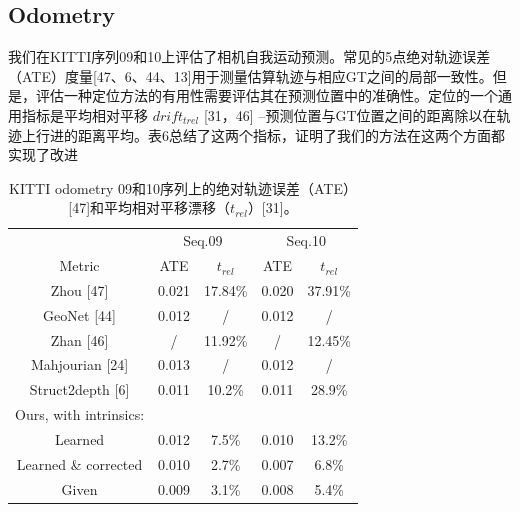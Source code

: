 \documentclass[10pt,journal,compsoc,UTF8]{IEEEtran}
\begin{document}
\subsection{Odometry}
我们在KITTI序列09和10上评估了相机自我运动预测。常见的5点绝对轨迹误差（ATE）度量[47、6、44、13]用于测量估算轨迹与相应GT之间的局部一致性。但是，评估一种定位方法的有用性需要评估其在预测位置中的准确性。定位的一个通用指标是平均相对平移 $drift_{trel}$ [31，46] –预测位置与GT位置之间的距离除以在轨迹上行进的距离平均。表6总结了这两个指标，证明了我们的方法在这两个方面都实现了改进

\begin{table}
  \centering
  \begin{tabular}{|c|c|c|c|c|}
  \hline
  &\multicolumn{2}{c|}{Seq.09}&\multicolumn{2}{c|}{Seq.10}\\
  \cline{2-5}
  Metric& ATE& $t_{rel}$ &ATE& $t_{rel}$\\
  \hline
  Zhou [47]         &  0.021& 17.84\%& 0.020& 37.91\%\\
  GeoNet [44]       &  0.012&   /    & 0.012&   /    \\
  Zhan [46]         &    /  & 11.92\%&   /  & 12.45\%\\
  Mahjourian [24]   &  0.013&   /    & 0.012&   /    \\
  Struct2depth [6]  &  0.011&  10.2\%& 0.011& 28.9\% \\
  \hline
  Ours, with intrinsics:&&&&\\
  Learned             & 0.012& 7.5\%& 0.010& 13.2\%\\
  Learned \& corrected& 0.010& 2.7\%& 0.007&  6.8\%\\
  Given               & 0.009& 3.1\%& 0.008&  5.4\%\\
  \hline
  \end{tabular}
  \caption{KITTI odometry 09和10序列上的绝对轨迹误差（ATE）[47]和平均相对平移漂移（$t_{rel}$）[31]。 }
\end{table}
\end{document}
